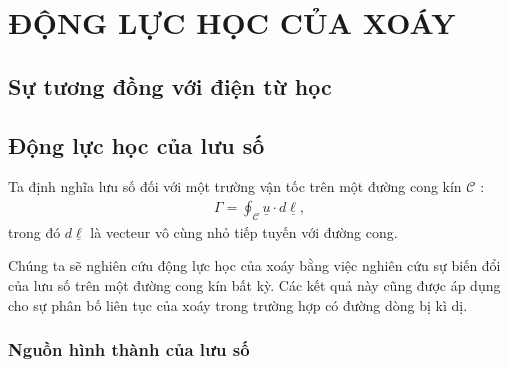 \documentclass[CO_LUU_CHAT.tex]{subfiles}
\begin{document}
	
\chapter{ĐỘNG LỰC HỌC CỦA XOÁY}


\newpage

\section{Sự tương đồng với điện từ học}



\section{Động lực học của lưu số}

	Ta định nghĩa lưu số đối với một trường vận tốc trên một đường cong kín $\mathscr{C}$ :
		\begin{equation}
			\begin{aligned}
				\Gamma = \oint_\mathscr{C} \underline{u}\cdot d\underline{\ell},
			\end{aligned}
		\end{equation}
	trong đó $d\underline{\ell}$ là vecteur vô cùng nhỏ tiếp tuyến với đường cong.

	Chúng ta sẽ nghiên cứu động lực học của xoáy bằng việc nghiên cứu sự biến đổi của lưu số trên một đường cong kín bất kỳ. Các kết quả này cũng được áp dụng cho sự phân bố liên tục của xoáy trong trường hợp có đường dòng bị kì dị.

\subsection{Nguồn hình thành của lưu số}
\end{document}
